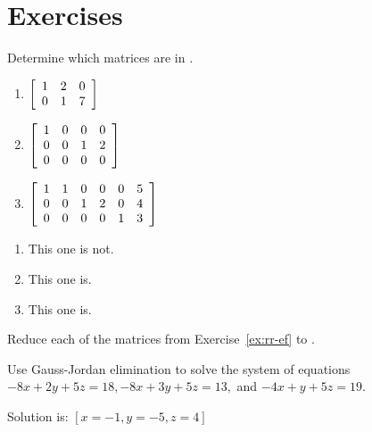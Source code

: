 \section*{Exercises}

\begin{enumialphparenastyle}

\begin{ex} Determine which matrices are in {\rref}. 

\begin{enumerate}
\item $\left[
\begin{array}{rrr}
1 & 2 & 0 \\
0 & 1 & 7
\end{array}
\right] $

\item $\left[
\begin{array}{rrrr}
1 & 0 & 0 & 0 \\
0 & 0 & 1 & 2 \\
0 & 0 & 0 & 0
\end{array}
\right] $

\item $\left[
\begin{array}{rrrrrr}
1 & 1 & 0 & 0 & 0 & 5 \\
0 & 0 & 1 & 2 & 0 & 4 \\
0 & 0 & 0 & 0 & 1 & 3
\end{array}
\right] $
\end{enumerate}
\begin{sol}
\begin{enumerate}
\item This one is not.
\item This one is.
\item This one is.
\end{enumerate}
\end{sol}
\end{ex}

\begin{ex}
 Reduce each of the matrices from Exercise~\ref{ex:rr-ef} to {\rref}.
\end{ex}

\begin{ex} Use Gauss-Jordan elimination to solve the system of equations
$-8x+2y+5z=18,-8x+3y+5z=13,$ and $-4x+y+5z=19.$
\begin{sol}
 Solution is: $\left[x=-1,y=-5,z=4\right] $
\end{sol}
\end{ex}


\end{enumialphparenastyle}
